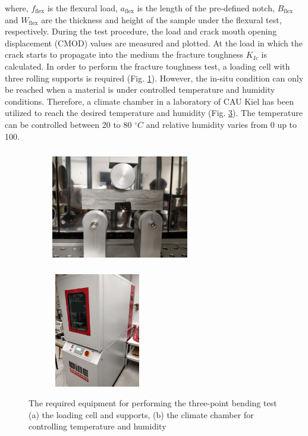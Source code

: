 where, $f_\text{flex}$ is the flexural load, $a_\text{flex}$ is the length of the pre-defined notch, $B_\text{flex}$ and $W_\text{flex}$ are the thickness and height of the sample under the flexural test, respectively. During the test procedure, the load and crack mouth opening displacement (CMOD) values are measured and plotted. At the load in which the crack starts to propagate into the medium the fracture toughness $K_{Ic}$ is calculated. In order to perform the fracture toughness test, a loading cell with three rolling supports is required (Fig. \ref{fig:Amir_Fracture_Toughness_Setup_a}). However, the in-situ condition can only be reached when a material is under controlled temperature and humidity conditions. Therefore, a climate chamber in a laboratory of CAU Kiel has been utilized to reach the desired temperature and humidity (Fig. \ref{fig:Amir_Fracture_Toughness_Setup_b}). The temperature can be controlled between 20 to 80 $^{\circ}C$ and relative humidity varies from 0 up to 100. 

\begin{figure}[!ht]
\centering
\begin{subfigure}[c]{0.6\textwidth}
\centering
\includegraphics[width=6cm,height=5cm]{figures/Amir_Fracture_Toughness_Setup_a.png}
\subcaption{}
\label{fig:Amir_Fracture_Toughness_Setup_a}
\end{subfigure}
\begin{subfigure}[c]{0.38\textwidth}
\centering
\includegraphics[width=4cm,height=5cm]{figures/Amir_Fracture_Toughness_Setup_b.png}
\subcaption{}
\label{fig:Amir_Fracture_Toughness_Setup_b}
\end{subfigure}
\caption{The required equipment for performing the three-point bending test (a) the loading cell and supports, (b) the climate chamber for controlling temperature and humidity}
\end{figure}

